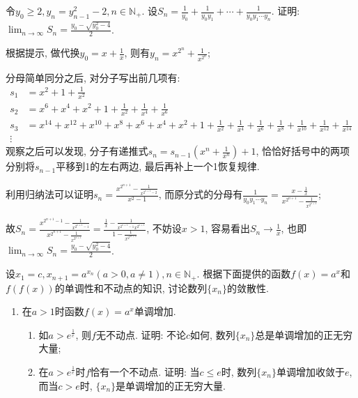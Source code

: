      \begin{exercise}
         令$y_0 \geqslant 2, y_n=y_{n-1}^2-2, n \in \mathbb{N}_+$. 设$S_n=\frac{1}{y_0}+\frac{1}{y_0y_1}+\cdots+\frac{1}{y_0y_1\cdots y_n}$. 证明: $\lim_{n\to\infty}S_n=\frac{y_0-\sqrt{y_0^2-4}}{2}$.
     \end{exercise}
     \begin{solution}
         根据提示, 做代换$y_0=x+\frac{1}{x}$, 则有$y_n=x^{2^n}+\frac{1}{x^{2^n}}$;

         分母简单同分之后, 对分子写出前几项有:
         \begin{align*}
             s_1 & =x^2+1+\frac{1}{x^2}                                                                                                                               \\
             s_2 & =x^6+x^4+x^2+1+\frac{1}{x^2}+\frac{1}{x^4}+\frac{1}{x^6}                                                                                           \\
             s_3 & =x^{14}+x^{12}+x^{10}+x^8+x^6+x^4+x^2+1+\frac{1}{x^2}+\frac{1}{x^4}+\frac{1}{x^6}+\frac{1}{x^8}+\frac{1}{x^{10}}+\frac{1}{x^{12}}+\frac{1}{x^{14}} \\
             \vdots
         \end{align*}
         观察之后可以发现, 分子有递推式$s_n=s_{n-1}(x^n+\frac{1}{x^n})+1$, 恰恰好括号中的两项分别将$s_{n-1}$平移到1的左右两边, 最后再补上一个1恢复规律.

         利用归纳法可以证明$s_n=\frac{x^{2^{n+1}}-\frac{1}{x^{2^{n+1}-2}}}{x^2-1}$, 而原分式的分母有$\frac{1}{y_0y_1\cdots y_n}=\frac{x-\frac{1}{x}}{x^{2^{n+1}}-\frac{1}{x^{2^{n+1}}}}$;

         故$S_n=\frac{x^{2^{n+1}-1}-\frac{1}{x^{2^{n+1}-1}}}{x^{2^{n+1}}-\frac{1}{x^{2^{n+1}}}}=\frac{\frac{1}{x}-\frac{1}{x^{2^{n+1}-1}x^{2^{n+1}}}}{1-\frac{1}{x^{2^{2n+2}}}}$, 不妨设$x>1$, 容易看出$S_n\to \frac{1}{x}$, 也即$\lim_{n\to\infty}S_n=\frac{y_0-\sqrt{y_0^2-4}}{2}$.
     \end{solution}

     \begin{exercise}
         设$x_1=c, x_{n+1}=a^{x_n}(a>0, a\neq 1), n \in \mathbb{N}_+$. 根据下面提供的函数$f(x)=a^x$和$f(f(x))$的单调性和不动点的知识, 讨论数列$\{x_n\}$的敛散性.
         \begin{enumerate}
             \item 在$a>1$时函数$f(x)=a^x$单调增加.
                   \begin{enumerate}
                       \item 如$a>e^\frac{1}{e}$, 则$f$无不动点. 证明: 不论$c$如何, 数列$\{x_n\}$总是单调增加的正无穷大量;
                       \item 在$a>e^\frac{1}{e}$时$f$恰有一个不动点. 证明: 当$c \leqslant e$时, 数列$\{x_n\}$单调增加收敛于$e$, 而当$c>e$时, $\{x_n\}$是单调增加的正无穷大量.
                   \end{enumerate}
         \end{enumerate}
     \end{exercise}
